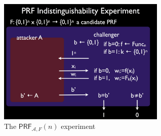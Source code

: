 \documentclass[a4paper,10pt,landscape,twocolumn]{scrartcl}
\begin{document}
\begin{figure}[h]
\center
\includegraphics[width=8cm]{PRFExperiment.jpg}
\caption{The $\mathsf{PRF}_{\mathcal{A},F}(n)$ experiment \label{fig}}
\end{figure}
\end{document}
